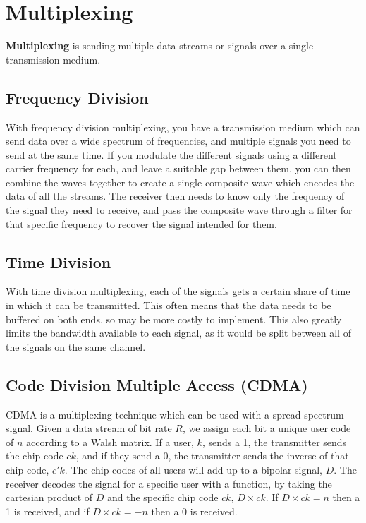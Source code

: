 \section*{Multiplexing}

\begin{definition*}{}{}
  \textbf{Multiplexing} is sending multiple data streams or signals over a single transmission medium.
\end{definition*}

\subsection*{Frequency Division}

With frequency division multiplexing, you have a transmission medium which can send data over a wide spectrum of frequencies,
 and multiple signals you need to send at the same time. If you modulate the different signals using a different carrier
 frequency for each, and leave a suitable gap between them, you can then combine the waves together to create a single
 composite wave which encodes the data of all the streams. The receiver then needs to know only the frequency of the
 signal they need to receive, and pass the composite wave through a filter for that specific frequency to recover the
 signal intended for them.

\subsection*{Time Division}

With time division multiplexing, each of the signals gets a certain share of time in which it can be transmitted. This
 often means that the data needs to be buffered on both ends, so may be more costly to implement. This also greatly
 limits the bandwidth available to each signal, as it would be split between all of the signals on the same channel.

\subsection*{Code Division Multiple Access (CDMA)}

CDMA is a multiplexing technique which can be used with a spread-spectrum signal. Given a data stream of bit rate $R$,
 we assign each bit a unique user code of $n$ according to a Walsh matrix. If a user, $k$, sends a 1, the transmitter
 sends the chip code $ck$, and if they send a 0, the transmitter sends the inverse of that chip code, $c'k$. The chip
 codes of all users will add up to a bipolar signal, $D$. The receiver decodes the signal for a specific user with a
 function, by taking the cartesian product of $D$ and the specific chip code $ck$, $D \times ck$. If $D \times ck = n$
 then a 1 is received, and if $D \times ck = -n$ then a 0 is received.

